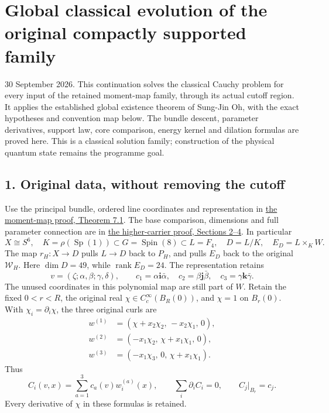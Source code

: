 \documentclass[11pt]{article}
\begin{document}
\section*{Global classical evolution of the original compactly supported family}

30 September 2026. This continuation solves the classical Cauchy problem
for every input of the retained moment-map family, through its actual
cutoff region. It applies the established global existence theorem of
Sung-Jin Oh, with the exact hypotheses and convention map below. The
bundle descent, parameter derivatives, support law, core comparison,
energy kernel and dilation formulas are proved here. This is a classical
solution family; construction of the physical quantum state remains the
programme goal.

\subsection*{1. Original data, without removing the cutoff}

Use the principal bundle, ordered line coordinates and representation in
\href{https://github.com/KokunoYumeto/yang-mills-interacting-workbench/blob/a15d9ffe8edaec69cdf91425dabbfe3170bd5ae9/yang-mills/continuations/20260930-s6-ns-moment-map-bridge/PROOF.md#7-the-global-triality-to-profile-morphism}{the moment-map proof, Theorem 7.1}.
The base comparison, dimensions and full parameter connection are in
\href{https://github.com/KokunoYumeto/yang-mills-interacting-workbench/blob/a15d9ffe8edaec69cdf91425dabbfe3170bd5ae9/yang-mills/continuations/20260930-s6-ns-moment-map-bridge/HIGHER_CARRIER_AND_EVOLUTION.md#2-the-reduction-carrier-and-its-exact-pullback}{the higher-carrier proof, Sections 2–4}.
In particular
\[
 X\cong S^6,\quad K=\rho(\operatorname{Sp}(1))\subset G=\operatorname{Spin}(8)
 \subset L=F_4,\quad D=L/K,\quad E_D=L\times_K W.
\]
The map \(r_H:X\to D\) pulls \(L\to D\) back to \(P_H\), and pulls \(E_D\)
back to the original \(\mathcal W_H\). Here \(\dim D=49\), while
\(\operatorname{rank}E_D=24\). The representation retains
\[
 v=(\zeta;\alpha,\beta;\gamma,\delta),\qquad
 c_1=\alpha\mathbf i\bar\alpha,\quad
 c_2=\beta\mathbf j\bar\beta,\quad
 c_3=\gamma\mathbf k\bar\gamma.
 \tag{CE1}
\]
The unused coordinates in this polynomial map are still part of \(W\).
Retain the fixed \(0<r<R\), the original real
\(\chi\in C_c^\infty(B_R(0))\), and \(\chi=1\) on \(B_r(0)\).
With \(\chi_i=\partial_i\chi\), the three original curls are
\[
 \begin{aligned}
 w^{(1)}&=(\chi+x_2\chi_2,\,-x_2\chi_1,\,0),\\
 w^{(2)}&=(-x_1\chi_2,\,\chi+x_1\chi_1,\,0),\\
 w^{(3)}&=(-x_1\chi_3,\,0,\,\chi+x_1\chi_1).
 \end{aligned}\tag{CE2}
\]
Thus
\[
 C_i(v,x)=\sum_{a=1}^3 c_a(v)w_i^{(a)}(x),\qquad
 \sum_i\partial_iC_i=0,\qquad
 C_j|_{B_r}=c_j.
 \tag{CE3}
\]
Every derivative of \(\chi\) in these formulas is retained.
\end{document}
